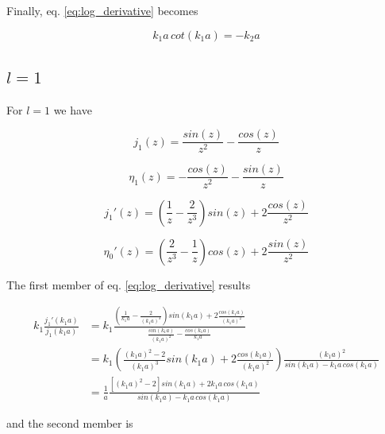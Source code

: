 \documentclass{article}
\begin{document}
Finally, eq. \eqref{eq:log_derivative} becomes

\begin{equation}
k_1a \, cot(k_1a) = -k_2a
\end{equation}

\subsection{\(l=1\)}

For \( l = 1 \) we have

\begin{equation}
j_1(z) = \frac{sin(z)}{z^2} - \frac{cos(z)}{z}
\end{equation}

\begin{equation}
\eta_1(z) = - \frac{cos(z)}{z^2} - \frac{sin(z)}{z}
\end{equation}

\begin{equation}
j_1'(z) = \left( \frac{1}{z} - \frac{2}{z^3} \right) sin(z) + 2 \frac{cos(z)}{z^2}
\end{equation}

\begin{equation}
\eta_0'(z) = \left( \frac{2}{z^3} - \frac{1}{z} \right) cos(z) + 2 \frac{sin(z)}{z^2}
\end{equation}

The first member of eq. \eqref{eq:log_derivative} results

\begin{align}
k_1 \frac{j_1'(k_1a)}{j_1(k_1a)} & = k_1 \frac{ \left( \frac{1}{k_1a} - \frac{2}{(k_1a)^3} \right) sin(k_1a) + 2 \frac{cos(k_1a)}{(k_1a)^2}}{\frac{sin(k_1a)}{(k_1a)^2} - \frac{cos(k_1a)}{k_1a}} \nonumber \\
& = k_1 \left( \frac{(k_1a)^2-2}{(k_1a)^3} sin(k_1a) + 2 \frac{cos(k_1a)}{(k_1a)^2} \right) \frac{(k_1a)^2}{sin(k_1a)-k_1a \, cos(k_1a)} \nonumber \\
& = \frac{1}{a} \frac{\left[ (k_1a)^2 - 2 \right] sin(k_1a) + 2k_1a \, cos(k_1a)}{sin(k_1a) - k_1a \, cos(k_1a)}
\end{align}

and the second member is
\end{document}
